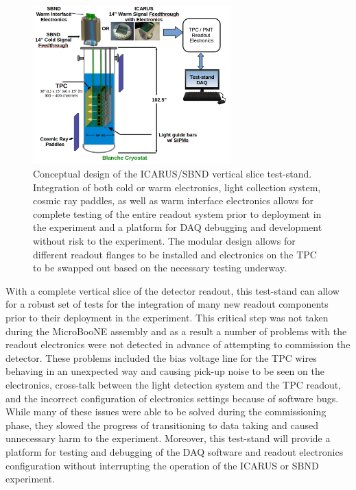 \begin{figure}[htb]
\centering
\includegraphics[width=0.68\textwidth]{images/teststand2.png}
\caption[]{Conceptual design of the ICARUS/SBND vertical slice test-stand. Integration of both cold or warm electronics, light collection system, cosmic ray paddles, as well as warm interface electronics allows for complete testing of the entire readout system prior to deployment in the experiment and a platform for DAQ debugging and development without risk to the experiment. The modular design allows for different readout flanges to be installed and electronics on the TPC to be swapped out based on the necessary testing underway.}
\label{fig:teststand}
\end{figure}

With a complete vertical slice of the detector readout, this test-stand can allow for a robust set of tests for the integration of many new readout components prior to their deployment in the experiment. This critical step was not taken during the MicroBooNE assembly and as a result a number of problems with the readout electronics were not detected in advance of attempting to commission the detector. These problems included the bias voltage line for the TPC wires behaving in an unexpected way and causing pick-up noise to be seen on the electronics, cross-talk between the light detection system and the TPC readout, and the incorrect configuration of electronics settings because of software bugs. While many of these issues were able to be solved during the commissioning phase, they slowed the progress of transitioning to data taking and caused unnecessary harm to the experiment. Moreover, this test-stand will provide a platform for testing and debugging of the DAQ software and readout electronics configuration without interrupting the operation of the ICARUS or SBND experiment. 

